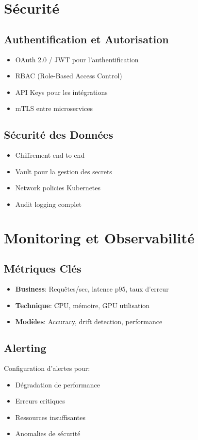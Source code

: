 \documentclass[12pt,a4paper]{article}
\begin{document}
\section{Sécurité}

\subsection{Authentification et Autorisation}
\begin{itemize}
    \item OAuth 2.0 / JWT pour l'authentification
    \item RBAC (Role-Based Access Control)
    \item API Keys pour les intégrations
    \item mTLS entre microservices
\end{itemize}

\subsection{Sécurité des Données}
\begin{itemize}
    \item Chiffrement end-to-end
    \item Vault pour la gestion des secrets
    \item Network policies Kubernetes
    \item Audit logging complet
\end{itemize}

\section{Monitoring et Observabilité}

\subsection{Métriques Clés}
\begin{itemize}
    \item \textbf{Business}: Requêtes/sec, latence p95, taux d'erreur
    \item \textbf{Technique}: CPU, mémoire, GPU utilisation
    \item \textbf{Modèles}: Accuracy, drift detection, performance
\end{itemize}

\subsection{Alerting}
Configuration d'alertes pour:
\begin{itemize}
    \item Dégradation de performance
    \item Erreurs critiques
    \item Ressources insuffisantes
    \item Anomalies de sécurité
\end{itemize}
\end{document}
